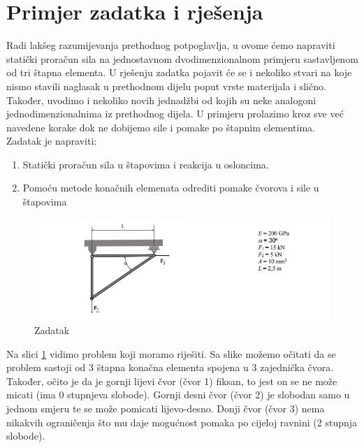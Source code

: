 \documentclass[a4paper,twoside,12pt]{memoir} %
\begin{document}
\newpage
\section{Primjer zadatka i rješenja}
\label{primjer_zadatka_i_rjesenja}
Radi lakšeg razumijevanja prethodnog potpoglavlja, u ovome ćemo napraviti statički proračun sila na jednostavnom dvodimenzionalnom primjeru sastavljenom od tri štapna elementa. U rješenju zadatka pojavit će se i nekoliko stvari na koje nismo stavili naglasak u prethodnom dijelu poput vrste materijala i slično. Također, uvodimo i nekoliko novih jednadžbi od kojih su neke analogoni jednodimenzionalnima iz prethodnog dijela. U primjeru prolazimo kroz sve već navedene korake dok ne dobijemo sile i pomake po štapnim elementima. \\
Zadatak je napraviti: 
\begin{enumerate}
    \item Statički proračun sila u štapovima i reakcija u osloncima.
    \item Pomoću metode konačnih elemenata odrediti pomake čvorova i sile u štapovima
\end{enumerate}

\begin{figure}[h!t]
\begin{center}
\includegraphics[scale=0.6]{pictures/chapter_fem/problem_glavas.png}
\caption{Zadatak}
\label{fig:problem__not_noted}
\end{center}
\end{figure}

Na slici \ref{fig:problem__not_noted} vidimo problem koji moramo riješiti. Sa slike možemo očitati da se problem sastoji od 3 štapna konačna elementa spojena u 3 zajednička čvora. Također, očito je da je gornji lijevi čvor (čvor 1) fiksan, to jest on se ne može micati (ima 0 stupnjeva slobode). Gornji desni čvor (čvor 2) je slobodan samo u jednom smjeru te se može pomicati lijevo-desno. Donji čvor (čvor 3) nema nikakvih ograničenja što mu daje mogućnost pomaka po cijeloj ravnini (2 stupnja slobode). \\
\end{document}
